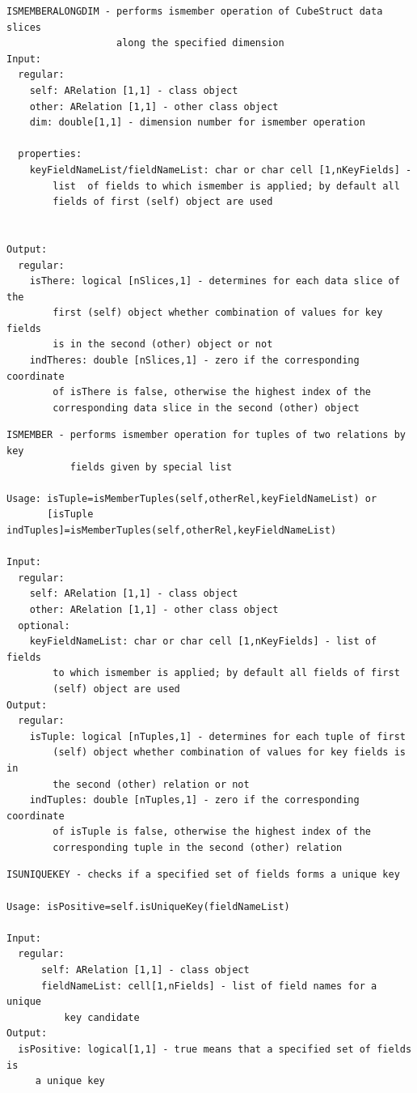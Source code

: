 \documentclass[letterpaper,10pt,english]{sphinxmanual}
\begin{document}
\begin{Verbatim}[commandchars=\\\{\}]
ISMEMBERALONGDIM - performs ismember operation of CubeStruct data slices
                   along the specified dimension
Input:
  regular:
    self: ARelation [1,1] - class object
    other: ARelation [1,1] - other class object
    dim: double[1,1] - dimension number for ismember operation

  properties:
    keyFieldNameList/fieldNameList: char or char cell [1,nKeyFields] -
        list  of fields to which ismember is applied; by default all
        fields of first (self) object are used


Output:
  regular:
    isThere: logical [nSlices,1] - determines for each data slice of the
        first (self) object whether combination of values for key fields
        is in the second (other) object or not
    indTheres: double [nSlices,1] - zero if the corresponding coordinate
        of isThere is false, otherwise the highest index of the
        corresponding data slice in the second (other) object
\end{Verbatim}

\begin{Verbatim}[commandchars=\\\{\}]
ISMEMBER - performs ismember operation for tuples of two relations by key
           fields given by special list

Usage: isTuple=isMemberTuples(self,otherRel,keyFieldNameList) or
       [isTuple indTuples]=isMemberTuples(self,otherRel,keyFieldNameList)

Input:
  regular:
    self: ARelation [1,1] - class object
    other: ARelation [1,1] - other class object
  optional:
    keyFieldNameList: char or char cell [1,nKeyFields] - list of fields
        to which ismember is applied; by default all fields of first
        (self) object are used
Output:
  regular:
    isTuple: logical [nTuples,1] - determines for each tuple of first
        (self) object whether combination of values for key fields is in
        the second (other) relation or not
    indTuples: double [nTuples,1] - zero if the corresponding coordinate
        of isTuple is false, otherwise the highest index of the
        corresponding tuple in the second (other) relation
\end{Verbatim}

\begin{Verbatim}[commandchars=\\\{\}]
ISUNIQUEKEY - checks if a specified set of fields forms a unique key

Usage: isPositive=self.isUniqueKey(fieldNameList)

Input:
  regular:
      self: ARelation [1,1] - class object
      fieldNameList: cell[1,nFields] - list of field names for a unique
          key candidate
Output:
  isPositive: logical[1,1] - true means that a specified set of fields is
     a unique key
\end{Verbatim}
\end{document}
